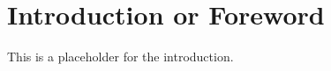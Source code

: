 \section*{Introduction or Foreword}
\label{sec:introduction}


This is a placeholder for the introduction.
